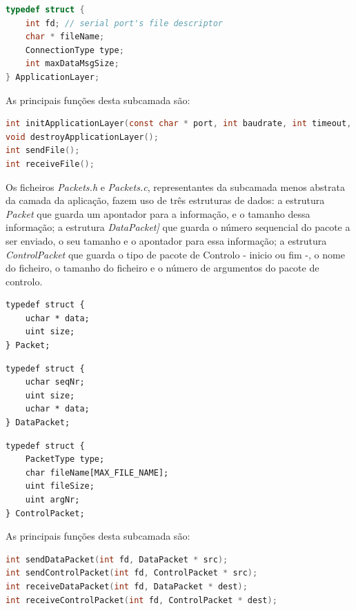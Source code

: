 \documentclass[a4paper, 11pt]{article}
\begin{document}
\begin{lstlisting}[language=C]
typedef struct {
    int fd; // serial port's file descriptor
    char * fileName;
    ConnectionType type;
    int maxDataMsgSize;
} ApplicationLayer;
\end{lstlisting}

As principais funções desta subcamada são:

\begin{lstlisting}[language=C]
int initApplicationLayer(const char * port, int baudrate, int timeout, int numRetries, ConnectionType type, int maxDataMsgSize, char * file);
void destroyApplicationLayer();
int sendFile();
int receiveFile();
\end{lstlisting}

Os ficheiros \textit{Packets.h} e \textit{Packets.c}, representantes da subcamada menos abstrata da camada da aplicação, fazem uso de três estruturas de dados: a estrutura \textit{Packet} que guarda um apontador para a informação, e o tamanho dessa informação; a estrutura \textit{DataPacket]} que guarda o número sequencial do pacote a ser enviado, o seu tamanho e o apontador para essa informação; a estrutura \textit{ControlPacket} que guarda o tipo de pacote de Controlo - inicio ou fim -, o nome do ficheiro, o tamanho do ficheiro e o número de argumentos do pacote de controlo.

\noindent\begin{minipage}{.22\textwidth}
\begin{lstlisting}[frame=tlrb]
typedef struct {
    uchar * data;
    uint size;
} Packet;
\end{lstlisting}
\end{minipage}\hfill
\begin{minipage}{.22\textwidth}
\begin{lstlisting}[frame=tlrb]
typedef struct {
    uchar seqNr;
    uint size;
    uchar * data;
} DataPacket;
\end{lstlisting}
\end{minipage}\hfill
\begin{minipage}{.4\textwidth}
\begin{lstlisting}[frame=tlrb]
typedef struct {
    PacketType type;
    char fileName[MAX_FILE_NAME];
    uint fileSize;
    uint argNr;
} ControlPacket;
\end{lstlisting}
\end{minipage}

As principais funções desta subcamada são:

\begin{lstlisting}[language=C]
int sendDataPacket(int fd, DataPacket * src);
int sendControlPacket(int fd, ControlPacket * src);
int receiveDataPacket(int fd, DataPacket * dest);
int receiveControlPacket(int fd, ControlPacket * dest);
\end{lstlisting}
\end{document}
